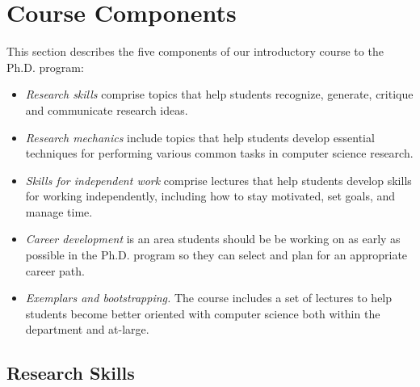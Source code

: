 \section{Course Components}\label{sec:components}

This section describes the five components of our introductory course
to the Ph.D. program:
\begin{itemize}
\itemsep=-1pt
\item {\em Research skills} comprise topics that help students
  recognize, generate, critique and communicate research ideas.
\item {\em Research mechanics} include topics that help students develop
  essential techniques for performing various common tasks in computer
  science research.
\item {\em Skills for independent work} comprise lectures that help
  students develop skills for working independently, including how to stay
  motivated, set goals, and manage time.
\item {\em Career development} is an area students should be be working
  on as early as possible in the Ph.D. program so they can select and
  plan for an appropriate career path.
\item {\em Exemplars and bootstrapping.} The course includes a set of
  lectures to help students become better oriented with computer science
  both within the department and at-large.
\end{itemize}

\subsection{Research Skills}

